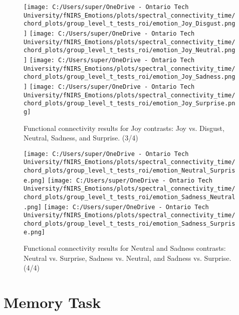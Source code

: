 \FloatBarrier

\begin{figure}[H]
    \ContinuedFloat
    \centering
    \texttt{[image: C:/Users/super/OneDrive - Ontario Tech University/fNIRS\_Emotions/plots/spectral\_connectivity\_time/chord\_plots/group\_level\_t\_tests\_roi/emotion\_Joy\_Disgust.png]}
    \texttt{[image: C:/Users/super/OneDrive - Ontario Tech University/fNIRS\_Emotions/plots/spectral\_connectivity\_time/chord\_plots/group\_level\_t\_tests\_roi/emotion\_Joy\_Neutral.png]}
    \texttt{[image: C:/Users/super/OneDrive - Ontario Tech University/fNIRS\_Emotions/plots/spectral\_connectivity\_time/chord\_plots/group\_level\_t\_tests\_roi/emotion\_Joy\_Sadness.png]}
    \texttt{[image: C:/Users/super/OneDrive - Ontario Tech University/fNIRS\_Emotions/plots/spectral\_connectivity\_time/chord\_plots/group\_level\_t\_tests\_roi/emotion\_Joy\_Surprise.png]}
    \caption*{Functional connectivity results for Joy contrasts: Joy vs. Disgust, Neutral, Sadness, and Surprise. (3/4)}
\end{figure}

\FloatBarrier

\begin{figure}[H]
    \ContinuedFloat
    \centering
    \texttt{[image: C:/Users/super/OneDrive - Ontario Tech University/fNIRS\_Emotions/plots/spectral\_connectivity\_time/chord\_plots/group\_level\_t\_tests\_roi/emotion\_Neutral\_Surprise.png]}
    \texttt{[image: C:/Users/super/OneDrive - Ontario Tech University/fNIRS\_Emotions/plots/spectral\_connectivity\_time/chord\_plots/group\_level\_t\_tests\_roi/emotion\_Sadness\_Neutral.png]}
    \texttt{[image: C:/Users/super/OneDrive - Ontario Tech University/fNIRS\_Emotions/plots/spectral\_connectivity\_time/chord\_plots/group\_level\_t\_tests\_roi/emotion\_Sadness\_Surprise.png]}
    \caption*{Functional connectivity results for Neutral and Sadness contrasts: Neutral vs. Surprise, Sadness vs. Neutral, and Sadness vs. Surprise. (4/4)}
\end{figure}

\label{tab:appendix_fc_emotion_analysis}


\chapter{Memory Task}
